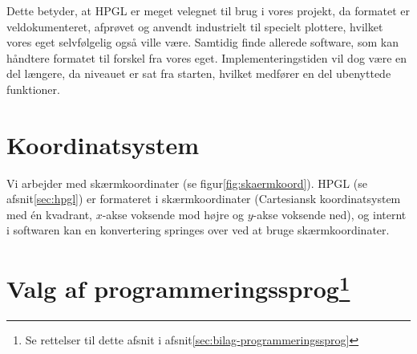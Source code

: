 Dette betyder, at HPGL er meget velegnet til brug i vores projekt, da
formatet er veldokumenteret, afprøvet og anvendt industrielt til
specielt plottere, hvilket vores eget selvfølgelig også ville være. Samtidig
finde allerede software, som kan håndtere formatet til forskel fra
vores eget. Implementeringstiden vil dog være en del længere, da
niveauet er sat fra starten, hvilket medfører en del ubenyttede
funktioner.


\section{Koordinatsystem}


Vi arbejder med skærmkoordinater (se
figur\vref{fig:skaermkoord}). HPGL (se afsnit\vref{sec:hpgl}) er
formateret i skærmkoordinater (Cartesiansk koordinatsystem med én
kvadrant, $x$-akse voksende mod højre og $y$-akse
voksende ned), og internt i softwaren kan en konvertering springes
over ved at bruge skærmkoordinater.


\section[Valg af programmeringssprog]{Valg af
  programmeringssprog\footnote{Se rettelser til dette afsnit i afsnit\vref{sec:bilag-programmeringssprog}}}

